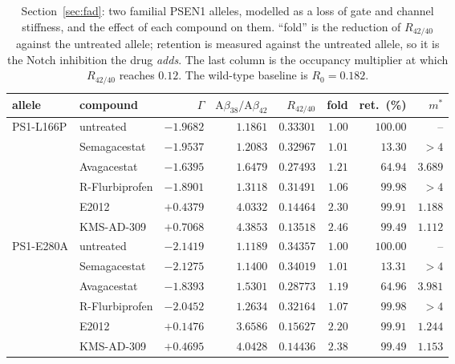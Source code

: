 \documentclass[11pt,reqno]{amsart}
\theoremstyle{plain}
\theoremstyle{definition}
\theoremstyle{remark}
\numberwithin{equation}{section}
\newcommand{\Ab}{\mathrm{A}\beta}
\begin{document}
\begin{table}[ht]
\centering\footnotesize\setlength{\tabcolsep}{4.5pt}
\caption{Section~\ref{sec:fad}: two familial PSEN1 alleles, modelled as a loss of gate and channel stiffness, and the effect of each compound on them. ``fold'' is the reduction of $R_{42/40}$ against the untreated allele; retention is measured against the untreated allele, so it is the Notch inhibition the drug \emph{adds}. The last column is the occupancy multiplier at which $R_{42/40}$ reaches $0.12$. The wild-type baseline is $R_0=0.182$.}
\label{tab:fad}
\begin{tabular}{@{}l l r r r r r r@{}}
\toprule
allele & compound & $\Gamma$ & $\Ab_{38}/\Ab_{42}$ & $R_{42/40}$ & fold & ret.\ (\%) & $m^\ast$ \\
\midrule
PS1-L166P & untreated & $-1.9682$ & $1.1861$ & $0.33301$ & $1.00$ & $100.00$ & -- \\
 & Semagacestat & $-1.9537$ & $1.2083$ & $0.32967$ & $1.01$ & $13.30$ & $>4$ \\
 & Avagacestat & $-1.6395$ & $1.6479$ & $0.27493$ & $1.21$ & $64.94$ & $3.689$ \\
 & R-Flurbiprofen & $-1.8901$ & $1.3118$ & $0.31491$ & $1.06$ & $99.98$ & $>4$ \\
 & E2012 & $+0.4379$ & $4.0332$ & $0.14464$ & $2.30$ & $99.91$ & $1.188$ \\
 & KMS-AD-309 & $+0.7068$ & $4.3853$ & $0.13518$ & $2.46$ & $99.49$ & $1.112$ \\
\midrule
PS1-E280A & untreated & $-2.1419$ & $1.1189$ & $0.34357$ & $1.00$ & $100.00$ & -- \\
 & Semagacestat & $-2.1275$ & $1.1400$ & $0.34019$ & $1.01$ & $13.31$ & $>4$ \\
 & Avagacestat & $-1.8393$ & $1.5301$ & $0.28773$ & $1.19$ & $64.96$ & $3.981$ \\
 & R-Flurbiprofen & $-2.0452$ & $1.2634$ & $0.32164$ & $1.07$ & $99.98$ & $>4$ \\
 & E2012 & $+0.1476$ & $3.6586$ & $0.15627$ & $2.20$ & $99.91$ & $1.244$ \\
 & KMS-AD-309 & $+0.4695$ & $4.0428$ & $0.14436$ & $2.38$ & $99.49$ & $1.153$ \\
\bottomrule
\end{tabular}
\end{table}



\clearpage

\end{document}
